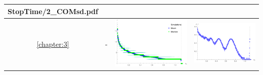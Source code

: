 \begin{table}[!htb]
\begin{tabular}{c|c|c|c}
\begin{minipage}{.4\textwidth}
			{StopTime/2_COMsd.pdf}
		\end{minipage}   
	 \\ \hline
		\ref{chapter:3} & - &
		\begin{minipage}{.4\textwidth}
			\includegraphics[width=\linewidth]
			{StopTime/3_BMtau.pdf}
		\end{minipage}
		& \begin{minipage}{.4\textwidth}
			\includegraphics[width=\linewidth]
			{StopTime/3_BMsd.pdf}
		\end{minipage}    
	\end{tabular}
\label{tab1}
\end{table}
